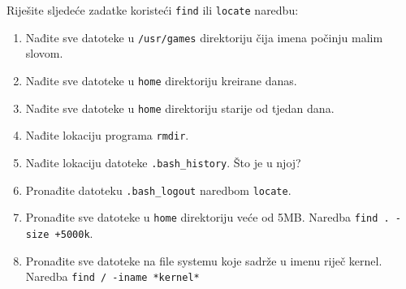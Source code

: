 \begin{zadatak} Riješite sljedeće zadatke koristeći \texttt{find} ili \texttt{locate} naredbu:
\begin{enumerate}
 \item Nađite sve datoteke u \texttt{/usr/games} direktoriju čija imena počinju malim slovom.
 \item Nađite sve datoteke u \texttt{home} direktoriju kreirane danas.
 \item Nađite sve datoteke u \texttt{home} direktoriju starije od tjedan dana.
 \item Nađite lokaciju programa \texttt{rmdir}.
 \item Nađite lokaciju datoteke \texttt{.bash\_history}. Što je u njoj?

 \item Pronađite datoteku \texttt{.bash\_logout} naredbom \texttt{locate}.
\item Pronađite sve datoteke u \texttt{home} direktoriju veće od 5MB. Naredba \texttt{find . -size +5000k}.
\item Pronađite sve datoteke na file systemu koje sadrže u imenu riječ kernel. Naredba \texttt{find / -iname *kernel*}
\end{enumerate}
\end{zadatak}
\begin{comment}

\vfill
\begin{itemize}
\renewcommand{\labelitemi}{\textbf{$\rightarrow$}}
\item Popis svih pokrenutih naredbi eksportirajte u datoteku imena \texttt{prezime\_ime\_vj4.txt}. Uploadajte datoteku na \href{https://moodle.oss.unist.hr/course/view.php?id=133}{http://moodle.oss.unist.hr}.
\end{itemize}

\end{comment}





